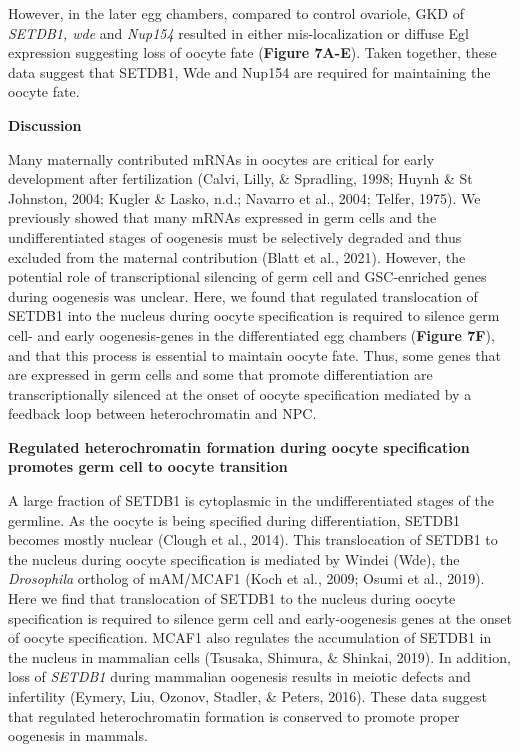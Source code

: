 \documentclass[12pt,oneside]{reedthesis}
\begin{document}
However, in the later egg chambers, compared to control ovariole, GKD of
\emph{SETDB1, wde} and \emph{Nup154} resulted in either mis-localization or
diffuse Egl expression suggesting loss of oocyte fate (\textbf{Figure 7A-E}).
Taken together, these data suggest that SETDB1, Wde and Nup154 are
required for maintaining the oocyte fate.

\textbf{Discussion}

Many maternally contributed mRNAs in oocytes are critical for early
development after fertilization (Calvi, Lilly, \& Spradling, 1998; Huynh \& St Johnston, 2004; Kugler \& Lasko, n.d.; Navarro et al., 2004; Telfer, 1975). We previously showed
that many mRNAs expressed in germ cells and the undifferentiated stages
of oogenesis must be selectively degraded and thus excluded from the
maternal contribution (Blatt et al., 2021). However,
the potential role of transcriptional silencing of germ cell and
GSC-enriched genes during oogenesis was unclear. Here, we found that
regulated translocation of SETDB1 into the nucleus during oocyte
specification is required to silence germ cell- and early
oogenesis-genes in the differentiated egg chambers (\textbf{Figure 7F}), and
that this process is essential to maintain oocyte fate. Thus, some genes
that are expressed in germ cells and some that promote differentiation
are transcriptionally silenced at the onset of oocyte specification
mediated by a feedback loop between heterochromatin and NPC.

\textbf{Regulated heterochromatin formation during oocyte specification
promotes germ cell to oocyte transition}

A large fraction of SETDB1 is cytoplasmic in the undifferentiated stages
of the germline. As the oocyte is being specified during
differentiation, SETDB1 becomes mostly nuclear
(Clough et al., 2014). This translocation of
SETDB1 to the nucleus during oocyte specification is mediated by Windei
(Wde), the \emph{Drosophila} ortholog of mAM/MCAF1
(Koch et al., 2009; Osumi et al., 2019).
Here we find that translocation of SETDB1 to the nucleus during oocyte
specification is required to silence germ cell and early-oogenesis genes
at the onset of oocyte specification. MCAF1 also regulates the
accumulation of SETDB1 in the nucleus in mammalian cells
(Tsusaka, Shimura, \& Shinkai, 2019). In addition, loss of \emph{SETDB1}
during mammalian oogenesis results in meiotic defects and infertility
(Eymery, Liu, Ozonov, Stadler, \& Peters, 2016). These data suggest
that regulated heterochromatin formation is conserved to promote proper
oogenesis in mammals.
\end{document}
